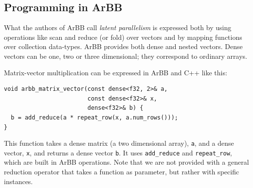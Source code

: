 \subsection{Programming in ArBB}
\label{sec:ProgrammingArBB}

What the authors of ArBB call {\em latent parallelism} is expressed both
by using operations like scan and reduce (or fold) over vectors and by
mapping functions over collection data-types.
ArBB provides both dense and nested vectors. 
Dense vectors can be one, two or three dimensional; they correspond
to ordinary arrays.


Matrix-vector multiplication can be expressed in ArBB and C++ like this: 
\begin{Verbatim}[samepage=true] 
void arbb_matrix_vector(const dense<f32, 2>& a, 
                        const dense<f32>& x,
                        dense<f32>& b) {
  b = add_reduce(a * repeat_row(x, a.num_rows()));
}
\end{Verbatim} 
\noindent
This function takes a dense matrix (a two dimensional array), {\tt a}, and a dense vector, {\tt x},
and returns a dense vector {\tt b}.
It
uses {\tt add\_reduce} and {\tt repeat\_row}, which are built in ArBB 
operations. Note that we are not provided with a general reduction operator
that takes a function as parameter,
but rather with specific instances.


